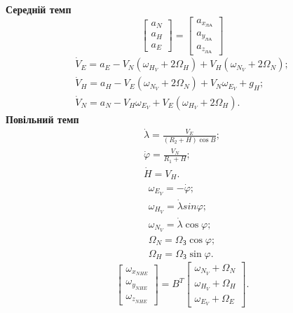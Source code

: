 \textbf{Середній темп}
\begin{equation} 
\label{eq:maccel} 
\left[\begin{array}{c} 
{a_{N} } \\ 
{a_{H} } \\ 
{a_{E} } \end{array}\right]=
\left[\begin{array}{c} 
{a_{x_{\text{ЛА}}}} \\ 
{a_{y_{\text{ЛА}}}} \\ 
{a_{z_{\text{ЛА}}}} 
\end{array}\right]                                                    
\end{equation} 
\begin{equation} 
\label{eq:mdv} 
\begin{array}{l} 
{\dot{V}_{E} =a_{E} -V_{N}(\omega_{H_{V}} +2\Omega_{H} )+V_{H} (\omega_{N_{V} } +2\Omega_{N} );} \\ 
{\dot{V}_{H} =a_{H} -V_{E}(\omega_{N_{V} } +2\Omega_{N} )+V_{N} \omega_{E_{V} } +g_{H} ;} \\ 
{\dot{V}_{N} =a_{N} -V_{H} \omega_{E_{V} } +V_{E} (\omega_{H_{V} } +2\Omega_{H} ).} 
\end{array} 
\end{equation} 
\textbf{Повільний темп}
\begin{equation} 
\label{eq:geocord} 
\begin{array}{l} 
{\dot{\lambda}=\frac{V_{E}}{(R_{2}+H)\cos B};} \\ 
{\dot{\varphi}=\frac{V_{N}}{R_{1}+H} ;} \\ 
{\dot{H}=V_{H}.} 
\end{array} 
\end{equation} 
\begin{equation} 
\label{eq:__8_26_} 
\begin{array}{l} 
{\omega_{E_{V} } =-\dot{\varphi};} \\ 
{\omega_{H_{V}} =\dot{\lambda}{sin}\varphi;} \\ 
{\omega_{N_{V} } =\dot{\lambda}\cos \varphi;} \\ 
{\Omega_{N} =\Omega_{\text{З}}\cos \varphi;} \\ 
{\Omega_{H} =\Omega_{\text{З}}\sin \varphi.} 
\end{array} 
\end{equation} 
\begin{equation} 
\label{eq:lomega}
\left[\begin{array}{c} 
{\omega_{x_{NHE}}} \\ 
{\omega_{y_{NHE}}} \\ 
{\omega_{z_{NHE}}} \end{array}\right]=B^{T} 
\left[\begin{array}{c} 
{\omega_{N_{V} } +\Omega_{N}} \\ 
{\omega_{H_{V} } +\Omega_{H}} \\ 
{\omega_{E_{V} } +\Omega_{E}} 
\end{array}\right].
\end{equation}
